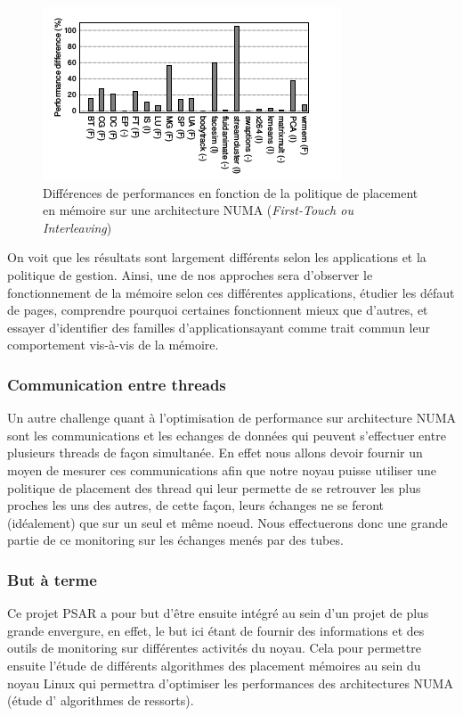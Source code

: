     \begin{figure}[H]
      \includegraphics[scale=0.65]{img/numa_memory_policy}
      \caption{Différences de performances en fonction de la politique de
        placement en mémoire sur une architecture NUMA (\textit{First-Touch ou Interleaving})}
    \end{figure}

    On voit que les résultats sont largement différents selon les applications
    et la politique de gestion. Ainsi, une de nos approches sera d'observer le
    fonctionnement de la mémoire selon ces différentes applications, étudier les
    défaut de pages, comprendre pourquoi certaines fonctionnent mieux que
    d'autres, et essayer d'identifier des \og familles d'applications\fg ayant
    comme trait commun leur comportement vis-à-vis de la mémoire.
    
  \subsubsection{Communication entre threads}
    
    Un autre challenge quant à l'optimisation de performance sur architecture 
    NUMA sont les communications et les echanges de données qui peuvent s'effectuer entre 
    plusieurs threads de façon simultanée. En effet nous allons devoir fournir un moyen
    de mesurer ces communications afin que notre noyau 
    puisse utiliser une politique de placement des thread qui leur permette de 
    se retrouver les plus proches les uns des autres, de cette façon, leurs échanges 
    ne se feront (idéalement) que sur un seul et même noeud. Nous effectuerons donc
    une grande partie de ce monitoring sur les échanges menés par des tubes.

  \subsubsection{But à terme}

    Ce projet PSAR a pour but d'être ensuite intégré au sein d'un projet de plus grande 
    envergure, en effet, le but ici étant de fournir des informations et des outils
    de monitoring sur différentes activités du noyau. Cela pour permettre ensuite 
    l'étude de différents algorithmes des placement mémoires au sein du noyau Linux
    qui permettra d'optimiser les performances des architectures NUMA (étude d'
    algorithmes de \og ressorts\fg).
